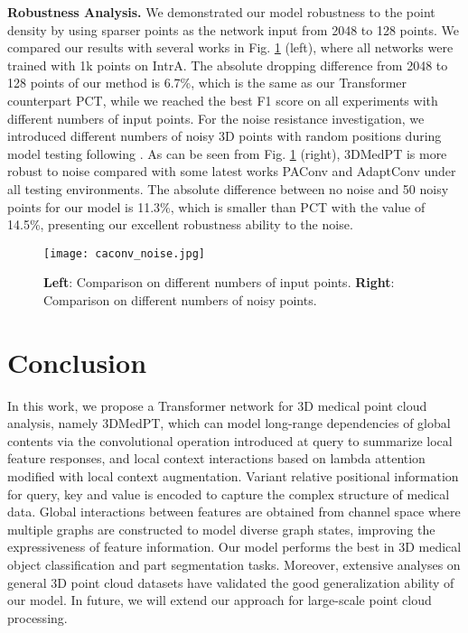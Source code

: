 \documentclass[10pt,twocolumn,letterpaper]{article}
\begin{document}
\noindent \textbf{Robustness Analysis.}
We demonstrated our model robustness to the point density by using sparser points as the network input from 2048 to 128 points.
We compared our results with several works in Fig. \ref{fig:noise} (left), where all networks were trained with 1k points on IntrA.
The absolute dropping difference from 2048 to 128 points of our method is 6.7\%, which is the same as our Transformer counterpart PCT, while we reached the best F1 score on all experiments with different numbers of input points.
For the noise resistance investigation, we introduced different numbers of noisy 3D points with random positions during model testing following \cite{pointasnl}.
As can be seen from Fig. \ref{fig:noise} (right), 3DMedPT is more robust to noise compared with some latest works PAConv \cite{paconv} and AdaptConv \cite{adapconv} under all testing environments.
The absolute difference between no noise and 50 noisy points for our model is 11.3\%, which is smaller than PCT with the value of 14.5\%, presenting our excellent robustness ability to the noise.

\begin{figure}
\centering
\texttt{[image: caconv\_noise.jpg]}
\caption{
\textbf{Left}: Comparison on different numbers of input points.
\textbf{Right}: Comparison on different numbers of noisy points.
} \label{fig:noise}
\end{figure}






\section{Conclusion}
In this work, we propose a Transformer network for 3D medical point cloud analysis, namely 3DMedPT, which can model long-range dependencies of global contents via the convolutional operation introduced at query to summarize local feature responses, and local context interactions based on lambda attention modified with local context augmentation.
Variant relative positional information for query, key and value is encoded to capture the complex structure of medical data.
Global interactions between features are obtained from channel space where multiple graphs are constructed to model diverse graph states, improving the expressiveness of feature information.
Our model performs the best in 3D medical object classification and part segmentation tasks.
Moreover, extensive analyses on general 3D point cloud datasets have validated the good generalization ability of our model. In future, we will extend our approach for large-scale point cloud processing.

{\small


}
\end{document}
